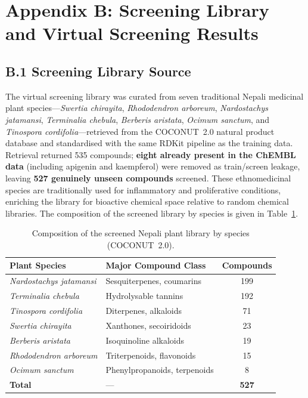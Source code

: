 \section*{Appendix B: Screening Library and Virtual
          Screening Results}
\label{app:library}

\subsection*{B.1 Screening Library Source}

The virtual screening library was curated from seven traditional Nepali medicinal
plant species---\textit{Swertia chirayita}, \textit{Rhododendron
arboreum}, \textit{Nardostachys jatamansi}, \textit{Terminalia
chebula}, \textit{Berberis aristata}, \textit{Ocimum sanctum},
and \textit{Tinospora cordifolia}---retrieved from the
COCONUT~2.0 natural product database \parencite{sorokina2021coconut}
and standardised with the same RDKit pipeline as the training data.
Retrieval returned 535 compounds; \textbf{eight already present in the ChEMBL data}
(including apigenin and kaempferol) were removed as train/screen leakage, leaving
\textbf{527 genuinely unseen compounds} screened. These ethnomedicinal species are
traditionally used for inflammatory and proliferative conditions, enriching the
library for bioactive chemical space relative to random chemical libraries. The
composition of the screened library by species is given in
Table~\ref{tab:app_nepali_lib}.

\begin{table}[H]
\caption{Composition of the screened Nepali plant library by species (COCONUT~2.0).}
\label{tab:app_nepali_lib}
\centering
\begin{tabular}{@{}llc@{}}
\toprule
\textbf{Plant Species} & \textbf{Major Compound Class}
                       & \textbf{Compounds} \\
\midrule
\textit{Nardostachys jatamansi} & Sesquiterpenes, coumarins    & 199 \\
\textit{Terminalia chebula}     & Hydrolysable tannins         & 192 \\
\textit{Tinospora cordifolia}   & Diterpenes, alkaloids        & 71  \\
\textit{Swertia chirayita}      & Xanthones, secoiridoids      & 23  \\
\textit{Berberis aristata}      & Isoquinoline alkaloids       & 19  \\
\textit{Rhododendron arboreum}  & Triterpenoids, flavonoids    & 15  \\
\textit{Ocimum sanctum}         & Phenylpropanoids, terpenoids & 8   \\
\midrule
\textbf{Total} & --- & \textbf{527} \\
\bottomrule
\end{tabular}
\end{table}

